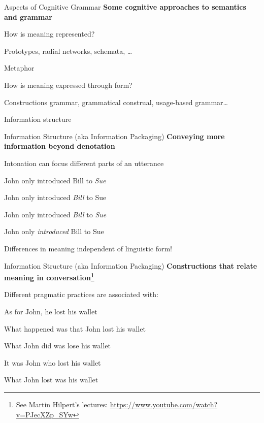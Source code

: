\documentclass[aspectratio=169,cramped]{beamer}
\let\tempone\itemize
\let\temptwo\enditemize
\renewenvironment{itemize}{\tempone\addtolength{\itemsep}{-0\baselineskip}\addtolength{\parskip}{-0.2\baselineskip}}{\temptwo}
\newcommand{\ex}[1]{{\color{teal} #1}}
\begin{document}
\begin{frame}{Aspects of Cognitive Grammar}
	\textbf{Some cognitive approaches to semantics and grammar}
  \begin{itemize}
    \item How is meaning represented?
      \begin{itemize}
      \item \ex{Prototypes, radial networks, schemata, \ldots}
      \item \ex{Metaphor}
      \end{itemize}
    \item How is meaning expressed through form?
      \begin{itemize}
      \item \ex{Constructions grammar, grammatical construal, usage-based grammar\ldots}
      \item \ex{Information structure}
      \end{itemize}
  \end{itemize}
\end{frame}

\begin{frame}{Information Structure (aka Information Packaging)}
	\textbf{Conveying more information beyond denotation}
  \begin{itemize}
  \item Intonation can focus different parts of an utterance
    \begin{itemize}
    \item \ex{John only introduced Bill to \emph{Sue}}
    \item \ex{John only introduced \emph{Bill} to Sue}
    \item \ex{John only introduced \emph{Bill} to \emph{Sue}}
    \item \ex{John only \emph{introduced} Bill to Sue}
    \end{itemize}
  \item Differences in meaning independent of linguistic form!
  \end{itemize}
\end{frame}

\begin{frame}{Information Structure (aka Information Packaging)}
	\textbf{Constructions that relate meaning in conversation\footnote{See Martin Hilpert's lectures:
    \protect\url{https://www.youtube.com/watch?v=PJecXZp_SYw}}}
\begin{itemize}
  \item Different pragmatic practices are associated with:
    \begin{itemize}
    \item \ex{As for John, he lost his wallet}
    \item \ex{What happened was that John lost his wallet}
    \item \ex{What John did was lose his wallet}
    \item \ex{It was John who lost his wallet}
    \item \ex{What John lost was his wallet}
    \end{itemize}
  \end{itemize}
\end{frame}
\end{document}
